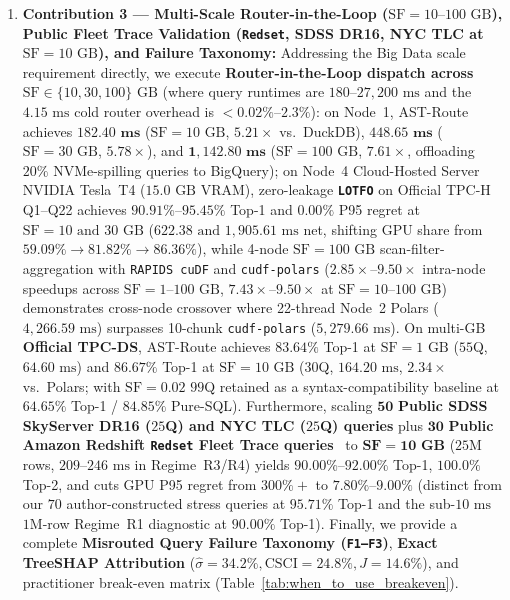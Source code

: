 \documentclass[10pt,a4paper]{article}
\begin{document}
\begin{enumerate}[leftmargin=1.5em,itemsep=1.5pt]
    \item \textbf{Contribution 3 --- Multi-Scale Router-in-the-Loop ($\text{SF}=10\text{--}100\text{ GB}$), Public Fleet Trace Validation (\texttt{Redset}, SDSS DR16, NYC TLC at $\text{SF}=10\text{ GB}$), and Failure Taxonomy:} Addressing the Big Data scale requirement directly, we execute \textbf{Router-in-the-Loop dispatch across $\text{SF}\in\{10,30,100\}\text{ GB}$} (where query runtimes are $180\text{--}27{,}200\text{ ms}$ and the $4.15\text{ ms}$ cold router overhead is $<0.02\%\text{--}2.3\%$): on Node~1, AST-Route achieves $\mathbf{182.40\text{ ms}}$ ($\text{SF}=10\text{ GB}$, $5.21\times$ vs.\ DuckDB), $\mathbf{448.65\text{ ms}}$ ($\text{SF}=30\text{ GB}$, $5.78\times$), and $\mathbf{1{,}142.80\text{ ms}}$ ($\text{SF}=100\text{ GB}$, $7.61\times$, offloading $20\%$ NVMe-spilling queries to BigQuery); on Node~4 Cloud-Hosted Server NVIDIA Tesla~T4 ($15.0\text{ GB}$ VRAM), zero-leakage \textbf{\texttt{LOTFO}} on Official TPC-H Q1--Q22 achieves $\mathbf{90.91\%\text{--}95.45\%}$ Top-1 and $\mathbf{0.00\%}$ P95 regret at $\text{SF}=10\text{ and }30\text{ GB}$ ($622.38\text{ and }1{,}905.61\text{ ms}$ net, shifting GPU share from $59.09\%\rightarrow 81.82\%\rightarrow 86.36\%$), while 4-node $\text{SF}=100\text{ GB}$ scan-filter-aggregation with \texttt{RAPIDS cuDF} and \texttt{cudf-polars} ($2.85\times\text{--}9.50\times$ intra-node speedups across $\text{SF}=1\text{--}100\text{ GB}$, $7.43\times\text{--}9.50\times$ at $\text{SF}=10\text{--}100\text{ GB}$) demonstrates cross-node crossover where 22-thread Node~2 Polars ($4{,}266.59\text{ ms}$) surpasses 10-chunk \texttt{cudf-polars} ($5{,}279.66\text{ ms}$). On multi-GB \textbf{Official TPC-DS}, AST-Route achieves $\mathbf{83.64\%}$ Top-1 at $\text{SF}=1\text{ GB}$ ($55$Q, $64.60\text{ ms}$) and $\mathbf{86.67\%}$ Top-1 at $\text{SF}=10\text{ GB}$ ($30$Q, $164.20\text{ ms}$, $2.34\times$ vs.\ Polars; with $\text{SF}=0.02$ $99$Q retained as a syntax-compatibility baseline at $64.65\%$ Top-1 / $84.85\%$ Pure-SQL). Furthermore, scaling $\mathbf{50}$ \textbf{Public SDSS SkyServer DR16 ($25$Q) and NYC TLC ($25$Q) queries} plus $\mathbf{30}$ \textbf{Public Amazon Redshift \texttt{Redset} Fleet Trace queries}~\cite{vanrenen2024redset} to $\mathbf{\text{SF}=10\text{ GB}}$ ($25\text{M}$ rows, $209\text{--}246\text{ ms}$ in Regime~R3/R4) yields $\mathbf{90.00\%\text{--}92.00\%}$ Top-1, $\mathbf{100.0\%}$ Top-2, and cuts GPU P95 regret from $300\%+$ to $\mathbf{7.80\%\text{--}9.00\%}$ (distinct from our $70$ author-constructed stress queries at $95.71\%$ Top-1 and the sub-$10\text{ ms}$ $1\text{M}$-row Regime~R1 diagnostic at $90.00\%$ Top-1). Finally, we provide a complete \textbf{Misrouted Query Failure Taxonomy (\texttt{F1--F3})}, \textbf{Exact TreeSHAP Attribution} ($\hat{\sigma}=34.2\%, \text{CSCI}=24.8\%, J=14.6\%$), and practitioner break-even matrix (Table~\ref{tab:when_to_use_breakeven}).
\end{enumerate}
\end{document}
